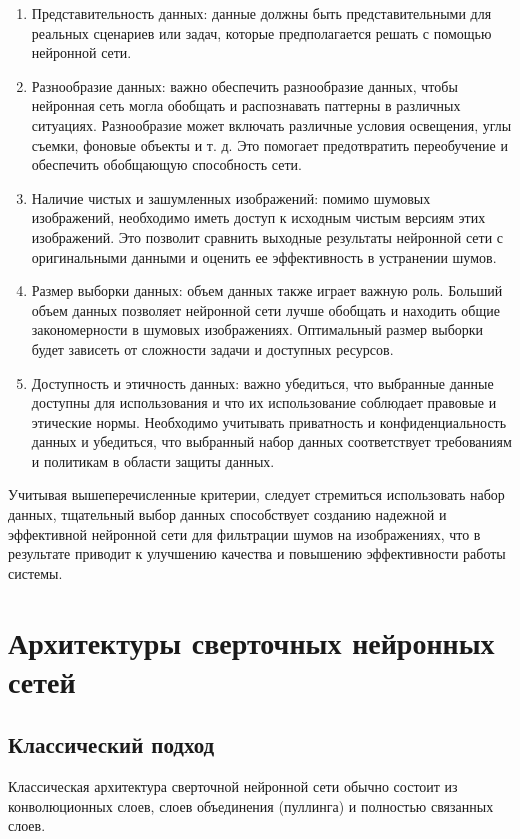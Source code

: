 \begin{enumerate}
    \item Представительность данных: данные должны быть представительными для реальных сценариев или задач, которые предполагается решать с помощью нейронной сети.
    \item Разнообразие данных: важно обеспечить разнообразие данных, чтобы нейронная сеть могла обобщать и распознавать паттерны в различных ситуациях. Разнообразие может включать различные условия освещения, углы съемки, фоновые объекты и т. д. Это помогает предотвратить переобучение и обеспечить обобщающую способность сети.
    \item Наличие чистых и зашумленных изображений: помимо шумовых изображений, необходимо иметь доступ к исходным чистым версиям этих изображений. Это позволит сравнить выходные результаты нейронной сети с оригинальными данными и оценить ее эффективность в устранении шумов.
    \item Размер выборки данных: объем данных также играет важную роль. Больший объем данных позволяет нейронной сети лучше обобщать и находить общие закономерности в шумовых изображениях. Оптимальный размер выборки будет зависеть от сложности задачи и доступных ресурсов.
    \item Доступность и этичность данных: важно убедиться, что выбранные данные доступны для использования и что их использование соблюдает правовые и этические нормы. Необходимо учитывать приватность и конфиденциальность данных и убедиться, что выбранный набор данных соответствует требованиям и политикам в области защиты данных.
\end{enumerate}

Учитывая вышеперечисленные критерии, следует стремиться использовать набор данных, тщательный выбор данных способствует созданию надежной и эффективной нейронной сети для фильтрации шумов на изображениях, что в результате приводит к улучшению качества и повышению эффективности работы системы.

\section{Архитектуры сверточных нейронных сетей}

\subsection{Классический подход}

Классическая архитектура сверточной нейронной сети обычно состоит из конволюционных слоев, слоев объединения (пуллинга) и полностью связанных слоев.

